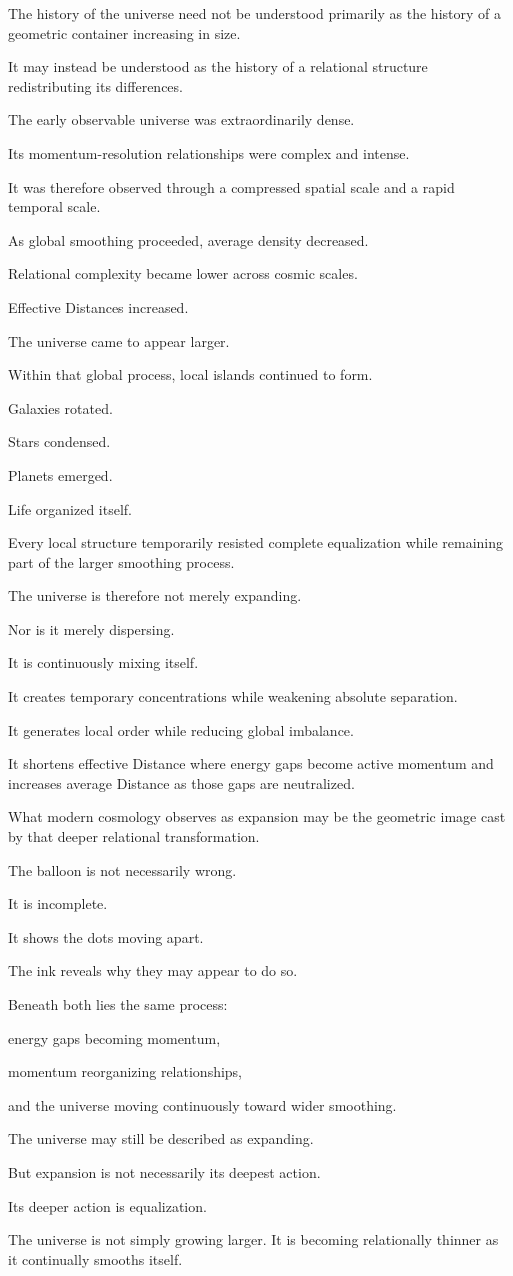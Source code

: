 The history of the universe need not be understood primarily as the history of a geometric container increasing in size.

It may instead be understood as the history of a relational structure redistributing its differences.

The early observable universe was extraordinarily dense.

Its momentum-resolution relationships were complex and intense.

It was therefore observed through a compressed spatial scale and a rapid temporal scale.

As global smoothing proceeded, average density decreased.

Relational complexity became lower across cosmic scales.

Effective Distances increased.

The universe came to appear larger.

Within that global process, local islands continued to form.

Galaxies rotated.

Stars condensed.

Planets emerged.

Life organized itself.

Every local structure temporarily resisted complete equalization while remaining part of the larger smoothing process.

The universe is therefore not merely expanding.

Nor is it merely dispersing.

It is continuously mixing itself.

It creates temporary concentrations while weakening absolute separation.

It generates local order while reducing global imbalance.

It shortens effective Distance where energy gaps become active momentum and increases average Distance as those gaps are neutralized.

What modern cosmology observes as expansion may be the geometric image cast by that deeper relational transformation.

The balloon is not necessarily wrong.

It is incomplete.

It shows the dots moving apart.

The ink reveals why they may appear to do so.

Beneath both lies the same process:

energy gaps becoming momentum,

momentum reorganizing relationships,

and the universe moving continuously toward wider smoothing.

The universe may still be described as expanding.

But expansion is not necessarily its deepest action.

Its deeper action is equalization.

The universe is not simply growing larger. It is becoming relationally thinner as it continually smooths itself.
